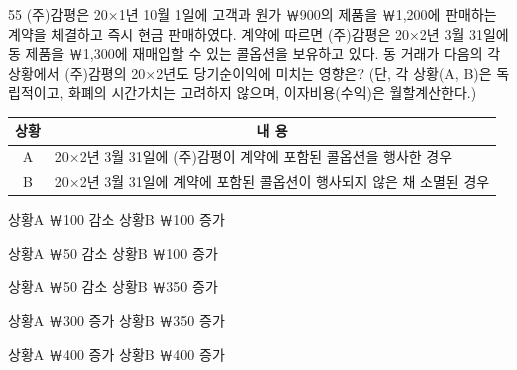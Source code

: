 \begin{question}{55}
(주)감평은 20×1년 10월 1일에 고객과 원가 ￦900의 제품을 ￦1,200에 판매하는 계약을 체결하고 즉시 현금 판매하였다. 계약에 따르면 (주)감평은 20×2년 3월 31일에 동 제품을 ￦1,300에 재매입할 수 있는 콜옵션을 보유하고 있다. 동 거래가 다음의 각 상황에서 (주)감평의 20×2년도 당기순이익에 미치는 영향은? (단, 각 상황(A, B)은 독립적이고, 화폐의 시간가치는 고려하지 않으며, 이자비용(수익)은 월할계산한다.)
\par{\small\centering\begin{tabular}{|c|l|}\hline
상황 & \multicolumn{1}{c|}{내 용} \\ \hline
A & 20×2년 3월 31일에 (주)감평이 계약에 포함된 콜옵션을 행사한 경우 \\
B & 20×2년 3월 31일에 계약에 포함된 콜옵션이 행사되지 않은 채 소멸된 경우 \\ \hline
\end{tabular}\par}
\begin{choices}
  \item 상황A ￦100 감소 \quad 상황B ￦100 증가
  \item 상황A ￦50 감소 \quad 상황B ￦100 증가
  \item 상황A ￦50 감소 \quad 상황B ￦350 증가
  \item 상황A ￦300 증가 \quad 상황B ￦350 증가
  \item 상황A ￦400 증가 \quad 상황B ￦400 증가
\end{choices}
\end{question}
